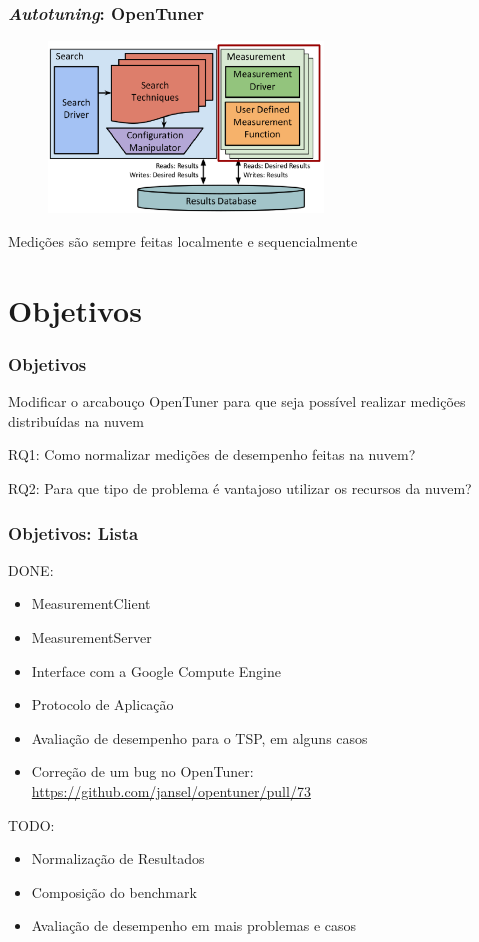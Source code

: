 \documentclass[10pt, compress]{beamer}
\begin{document}
\begin{frame}[fragile]
  \frametitle{\emph{Autotuning}: OpenTuner}
  \begin{figure}[H]
      \includegraphics[width=0.65\textwidth]{opentuner-measurement.png}
  \end{figure}
  Medições são sempre feitas \alert{localmente} e \alert{sequencialmente}
\end{frame}

\section{Objetivos}

\begin{frame}[fragile]
  \frametitle{Objetivos}
  \alert{Modificar} o arcabouço OpenTuner para que seja possível
  realizar medições \alert{distribuídas} na nuvem

  \alert{RQ1}: Como normalizar medições de desempenho feitas na nuvem?

  \alert{RQ2}: Para que tipo de problema é vantajoso utilizar os recursos da nuvem?
\end{frame}

\begin{frame}[fragile]
  \frametitle{Objetivos: Lista}
  \alert{DONE}:
  \begin{itemize}
      \item \alert{MeasurementClient}
      \item \alert{MeasurementServer}
      \item \alert{Interface} com a Google Compute Engine
      \item \alert{Protocolo} de Aplicação
      \item Avaliação de \alert{desempenho} para o \alert{TSP},
          em alguns casos
      \item Correção de um \alert{bug} no OpenTuner: 
          \url{https://github.com/jansel/opentuner/pull/73}
  \end{itemize}
  \alert{TODO}:
  \begin{itemize}
      \item \alert{Normalização} de Resultados
      \item Composição do \alert{benchmark}
      \item Avaliação de \alert{desempenho} em mais problemas
          e casos
  \end{itemize}
\end{frame}
\end{document}

